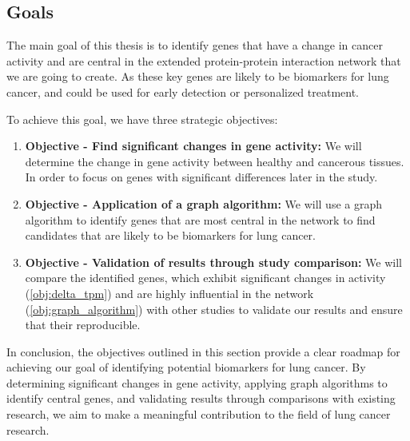 \subsection{Goals} \label{subsec:goals}

The main goal of this thesis is to identify genes that have a change in cancer activity
and are central in the extended protein-protein interaction network that we are going to create.
As these key genes are likely to be biomarkers for lung cancer,
and could be used for early detection or personalized treatment.

To achieve this goal, we have three strategic objectives:
\begin{enumerate}
    \item \textbf{Objective - Find significant changes in gene activity:}
    We will determine the change in gene activity between healthy and cancerous tissues.
    In order to focus on genes with significant differences later in the study.
    \label{obj:delta_tpm}

    \item \textbf{Objective - Application of a graph algorithm:}
    We will use a graph algorithm to identify genes that are most central in the network
    to find candidates that are likely to be biomarkers for lung cancer.
    \label{obj:graph_algorithm}

    \item \textbf{Objective - Validation of results through study comparison:}
    We will compare the identified genes,
    which exhibit significant changes in activity (\ref{obj:delta_tpm})
    and are highly influential in the network (\ref{obj:graph_algorithm}) with other studies
    to validate our results and ensure that their reproducible.
    \label{obj:validation}
\end{enumerate}

In conclusion, the objectives outlined in this section provide a clear roadmap for achieving our goal
of identifying potential biomarkers for lung cancer.
By determining significant changes in gene activity, applying graph algorithms to identify central genes,
and validating results through comparisons with existing research,
we aim to make a meaningful contribution to the field of lung cancer research.
